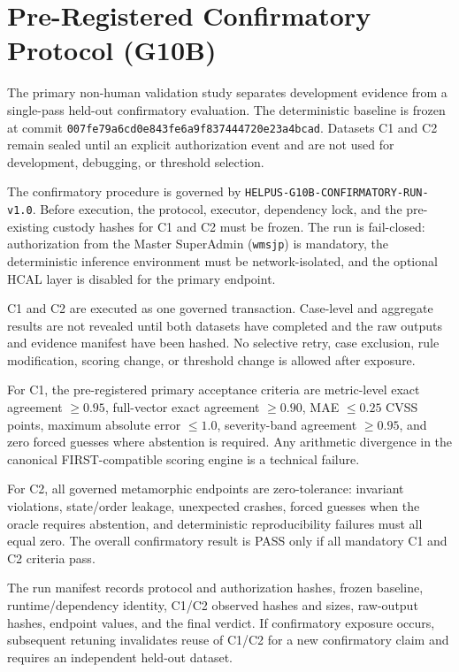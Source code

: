 \section{Pre-Registered Confirmatory Protocol (G10B)}
\label{sec:g10b-confirmatory}

The primary non-human validation study separates development evidence from a
single-pass held-out confirmatory evaluation. The deterministic baseline is
frozen at commit
\texttt{007fe79a6cd0e843fe6a9f837444720e23a4bcad}. Datasets C1 and C2
remain sealed until an explicit authorization event and are not used for
development, debugging, or threshold selection.

The confirmatory procedure is governed by
\texttt{HELPUS-G10B-CONFIRMATORY-RUN-v1.0}. Before execution, the
protocol, executor, dependency lock, and the pre-existing custody hashes for
C1 and C2 must be frozen. The run is fail-closed: authorization from the
Master SuperAdmin (\texttt{wmsjp}) is mandatory, the deterministic inference
environment must be network-isolated, and the optional HCAL layer is disabled
for the primary endpoint.

C1 and C2 are executed as one governed transaction. Case-level and aggregate
results are not revealed until both datasets have completed and the raw
outputs and evidence manifest have been hashed. No selective retry, case
exclusion, rule modification, scoring change, or threshold change is allowed
after exposure.

For C1, the pre-registered primary acceptance criteria are metric-level exact
agreement $\geq 0.95$, full-vector exact agreement $\geq 0.90$, MAE
$\leq 0.25$ CVSS points, maximum absolute error $\leq 1.0$, severity-band
agreement $\geq 0.95$, and zero forced guesses where abstention is required.
Any arithmetic divergence in the canonical FIRST-compatible scoring engine is
a technical failure.

For C2, all governed metamorphic endpoints are zero-tolerance: invariant
violations, state/order leakage, unexpected crashes, forced guesses when the
oracle requires abstention, and deterministic reproducibility failures must
all equal zero. The overall confirmatory result is PASS only if all mandatory
C1 and C2 criteria pass.

The run manifest records protocol and authorization hashes, frozen baseline,
runtime/dependency identity, C1/C2 observed hashes and sizes, raw-output hashes,
endpoint values, and the final verdict. If confirmatory exposure occurs,
subsequent retuning invalidates reuse of C1/C2 for a new confirmatory claim and
requires an independent held-out dataset.
